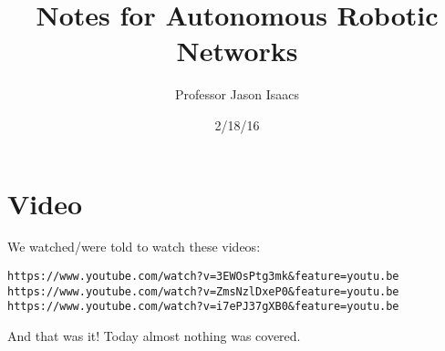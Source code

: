 \documentclass{article}
\title{Notes for Autonomous Robotic Networks}
\author{Professor Jason Isaacs}
\date{2/18/16}
\begin{document}
\maketitle
\section{Video}
We watched/were told to watch these videos:
\begin{verbatim}https://www.youtube.com/watch?v=3EWOsPtg3mk&feature=youtu.be
https://www.youtube.com/watch?v=ZmsNzlDxeP0&feature=youtu.be
https://www.youtube.com/watch?v=i7ePJ37gXB0&feature=youtu.be
\end{verbatim}
And that was it! Today almost nothing was covered.
\end{document}
